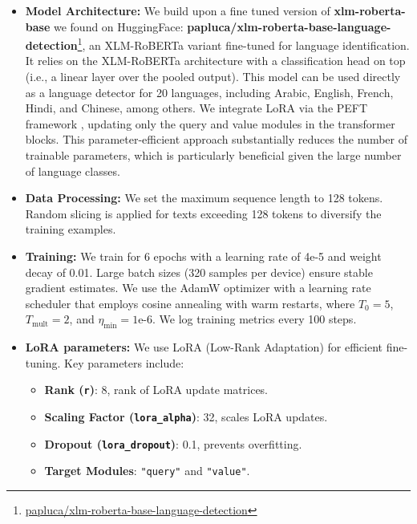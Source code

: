 \documentclass[11pt]{article}
\begin{document}
\begin{itemize}[leftmargin=*]
    \item \textbf{Model Architecture:} We build upon a fine tuned version of \textbf{xlm-roberta-base} we found on HuggingFace: \textbf{papluca/xlm-roberta-base-language-detection}\footnote{\href{https://huggingface.co/papluca/xlm-roberta-base-language-detection}{papluca/xlm-roberta-base-language-detection}}, an XLM-RoBERTa variant fine-tuned for language identification. It relies on the XLM-RoBERTa architecture \citep{conneau2020unsupervised} with a classification head on top (i.e., a linear layer over the pooled output). This model can be used directly as a language detector for 20 languages, including Arabic, English, French, Hindi, and Chinese, among others. We integrate LoRA \citep{hu2022lora} via the PEFT framework \citep{peft}, updating only the query and value modules in the transformer blocks. This parameter-efficient approach substantially reduces the number of trainable parameters, which is particularly beneficial given the large number of language classes.
    
   
    
    \item \textbf{Data Processing:} We set the maximum sequence length to 128 tokens. Random slicing is applied for texts exceeding 128 tokens to diversify the training examples.
    
    \item \textbf{Training:} We train for 6 epochs with a learning rate of 4e-5 and weight decay of 0.01. Large batch sizes (320 samples per device) ensure stable gradient estimates. We use the AdamW optimizer with a learning rate scheduler that employs cosine annealing with warm restarts, where \( T_0 = 5 \), \( T_{\text{mult}} = 2 \), and \( \eta_{\text{min}} = 1\text{e-6} \).  We log training metrics every 100 steps.
    
    \item \textbf{LoRA parameters:}
    We use LoRA (Low-Rank Adaptation) for efficient fine-tuning. Key parameters include:

    \begin{itemize}
        \item \textbf{Rank (\texttt{r})}: 8, rank of LoRA update matrices.
        \item \textbf{Scaling Factor (\texttt{lora\_alpha})}: 32, scales LoRA updates.
        \item \textbf{Dropout (\texttt{lora\_dropout})}: 0.1, prevents overfitting.
        \item \textbf{Target Modules}: \texttt{"query"} and \texttt{"value"}.
    \end{itemize}

    
\end{itemize}
\end{document}
